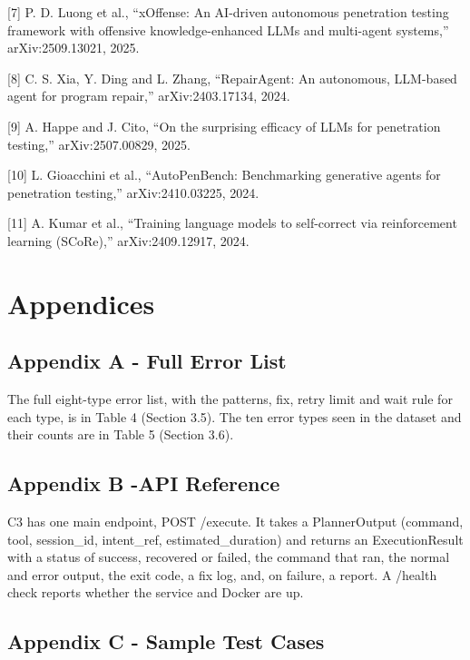 \documentclass[
]{article}
\begin{document}
{[}7{]} P. D. Luong et al., ``xOffense: An AI-driven autonomous
penetration testing framework with offensive knowledge-enhanced LLMs and
multi-agent systems,'' arXiv:2509.13021, 2025.

{[}8{]} C. S. Xia, Y. Ding and L. Zhang, ``RepairAgent: An autonomous,
LLM-based agent for program repair,'' arXiv:2403.17134, 2024.

{[}9{]} A. Happe and J. Cito, ``On the surprising efficacy of LLMs for
penetration testing,'' arXiv:2507.00829, 2025.

{[}10{]} L. Gioacchini et al., ``AutoPenBench: Benchmarking generative
agents for penetration testing,'' arXiv:2410.03225, 2024.

{[}11{]} A. Kumar et al., ``Training language models to self-correct via
reinforcement learning (SCoRe),'' arXiv:2409.12917, 2024.

\hypertarget{appendices}{%
\section{Appendices}\label{appendices}}

\hypertarget{appendix-a---full-error-list}{%
\subsection{Appendix A - Full Error
List}\label{appendix-a---full-error-list}}

The full eight-type error list, with the patterns, fix, retry limit and
wait rule for each type, is in Table 4 (Section 3.5). The ten error
types seen in the dataset and their counts are in Table 5 (Section 3.6).

\hypertarget{appendix-b--api-reference}{%
\subsection{Appendix B -API Reference}\label{appendix-b--api-reference}}

C3 has one main endpoint, POST /execute. It takes a PlannerOutput
(command, tool, session\_id, intent\_ref, estimated\_duration) and
returns an ExecutionResult with a status of success, recovered or
failed, the command that ran, the normal and error output, the exit
code, a fix log, and, on failure, a report. A /health check reports
whether the service and Docker are up.

\hypertarget{appendix-c---sample-test-cases}{%
\subsection{Appendix C - Sample Test
Cases}\label{appendix-c---sample-test-cases}}
\end{document}
